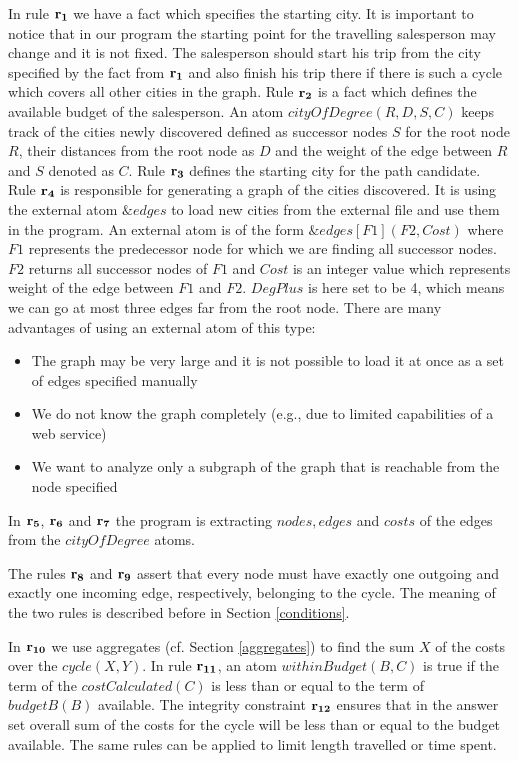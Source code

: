 \documentclass[a4paper, titlepage]{article}
\newcommand{\ext}[3]{\ensuremath{\&{#1}[#2](#3)}}
\newcommand{\row}[1]{%
  \ensuremath{\color{black}\ensuremath{\mathbf{#1}} \color{black}}%
}
\begin{document}
In rule $\row{r_1}$ we have a fact which specifies the starting 
city. 
It is important to notice that in our program the starting 
point for the travelling salesperson may change and it is not 
fixed. The salesperson should start his trip from the 
city specified by the fact from $\row{r_1}$ and also finish 
his trip there if there is such a cycle which covers all 
other cities in the graph. Rule $\row{r_2}$ is a fact which defines the 
available budget of the salesperson. An atom $\mathit{cityOfDegree(R,D,S,C)}$ keeps 
track of the cities newly discovered defined as successor 
nodes $S$ for the root node $R$, their distances from the 
root node as $D$ and the weight of the edge between $R$ and $S$ 
denoted as $C$. Rule $\row{r_3}$ defines the starting city for 
the path candidate. Rule $\row{r_4}$ is responsible for 
generating a graph of 
the cities discovered. It is using the external atom 
$\mathit{\&edges}$ to load new cities from the external 
file and use them in the program. An external atom is of 
the form $\ext{edges}{F1}{F2,Cost}$ where $\mathit{F1}$ 
represents the predecessor node for which we are finding 
all successor 
nodes. $\mathit{F2}$ returns all successor nodes of 
$\mathit{F1}$ and $\mathit{Cost}$ is an integer value which 
represents weight of the edge between $\mathit{F1}$ and 
$\mathit{F2}$. $\mathit{DegPlus}$ is here set to be 4, which means we can go at most three edges far from the root node. 
There are many advantages of using an external atom of this
type:
\begin{itemize}
\item The graph may be very large and it is not possible to load it 
at once as a set of edges specified manually
\item We do not know the graph completely (e.g., due to limited capabilities of a web service)
\item We want to analyze only a subgraph of the graph that is 
reachable from the node specified
\end{itemize}    
In $\row{r_5}$, $\row{r_6}$ and $\row{r_7}$ the program is extracting 
$\mathit{nodes}, \mathit{edges}$ and $\mathit{costs}$ of 
the edges from the $\mathit{cityOfDegree}$ atoms. 

The rules $\row{r_8}$ and $\row{r_9}$ assert that every 
node must have exactly one outgoing and exactly one 
incoming edge, respectively, belonging to the cycle. The meaning of the two rules is described before in Section 
\ref{conditions}.

In $\row{r_{10}}$ we use aggregates (cf. Section 
\ref{aggregates}) to find the sum $X$ of the costs over the 
$\mathit{cycle(X,Y)}$. In rule $\row{r_{11}}$, an atom 
$\mathit{withinBudget(B,C)}$ is true if the term of the 
$\mathit{costCalculated(C)}$ is less than or equal to the 
term of $\mathit{budgetB(B)}$ available. The integrity 
constraint $\row{r_{12}}$ ensures that in the answer 
set overall sum of the costs for the cycle will be less 
than or equal to the budget available. The same rules can be applied to limit length travelled or time spent.
\end{document}
